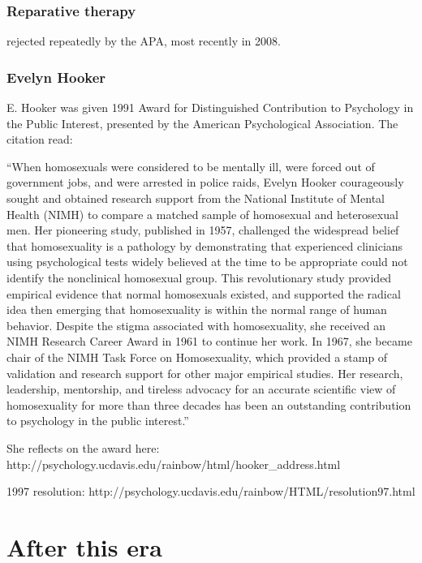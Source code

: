 \subsubsection{Reparative therapy}
\label{reparativetherapy}

rejected repeatedly by the APA, most recently in 2008.

\subsubsection{Evelyn Hooker}
\label{evelynhooker}

E. Hooker was given 1991 Award for Distinguished Contribution to Psychology in the Public Interest, presented by the American Psychological Association. The citation read:

``When homosexuals were considered to be mentally ill, were forced out of government jobs, and were arrested in police raids, Evelyn Hooker courageously sought and obtained research support from the National Institute of Mental Health (NIMH) to compare a matched sample of homosexual and heterosexual men. Her pioneering study, published in 1957, challenged the widespread belief that homosexuality is a pathology by demonstrating that experienced clinicians using psychological tests widely believed at the time to be appropriate could not identify the nonclinical homosexual group. This revolutionary study provided empirical evidence that normal homosexuals existed, and supported the radical idea then emerging that homosexuality is within the normal range of human behavior. Despite the stigma associated with homosexuality, she received an NIMH Research Career Award in 1961 to continue her work. In 1967, she became chair of the NIMH Task Force on Homosexuality, which provided a stamp of validation and research support for other major empirical studies. Her research, leadership, mentorship, and tireless advocacy for an accurate scientific view of homosexuality for more than three decades has been an outstanding contribution to psychology in the public interest.''

She reflects on the award here: http:\slash \slash psychology.ucdavis.edu\slash rainbow\slash html\slash hooker\_address.html 

1997 resolution: http:\slash \slash psychology.ucdavis.edu\slash rainbow\slash HTML\slash resolution97.html

\section{After this era}
\label{afterthisera}

